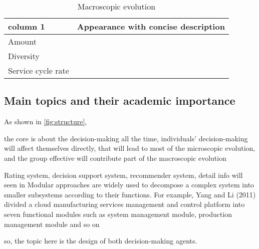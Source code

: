 \begin{table}[htbp]
 	\caption{Macroscopic evolution}
 	\label{tab:macroevolution}
 	\centering
 	\scriptsize
 	\begin{tabularx}{\textwidth}{llX}
 	\toprule
 	\textbf{column 1} & \multicolumn{2}{l}{\textbf{Appearance with concise description}} \\
 	\midrule
 	Amount & & \\
 	Diversity & & \\
 	Service cycle rate & & \\
 	\bottomrule
 	\end{tabularx}
 \end{table} 



\subsection{Main topics and their academic importance}
As shown in \autoref{fig:structure},

the core is about the decision-making all the time, individuals' decision-making will affect themselves directly, that will lead to most of the microscopic evolution, and the group effective will contribute part of the macroscopic evolution 

Rating system, decision support system, recommender system,
detail info will seen in
Modular approaches are widely used to decompose a complex system into smaller subsystems according to their functions. For example, Yang and Li (2011) divided a cloud manufacturing services management and control platform into seven functional modules such as system management module, production management module and so on

so, the topic here is the design of both decision-making agents.
